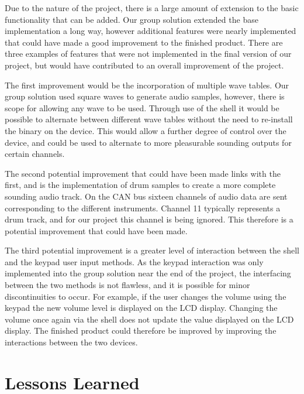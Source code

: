 Due to the nature of the project, there is a large amount of extension to the 
basic functionality that can be added. Our group solution extended the base 
implementation a long way, however additional features were nearly implemented
that could have made a good improvement to the finished product. 
There are three examples of features that were not implemented in the final 
version of our project, but would have contributed to an overall improvement of 
the project. 
\par\bigskip\noindent
The first improvement would be the incorporation of multiple wave 
tables. 
Our group solution used square waves to generate audio samples, however, 
there is scope for allowing any wave to be used. 
Through use of the shell it would be possible to alternate between different 
wave tables without the need to re-install the binary on the device. This would 
allow a further degree of control over the device, and could be used to alternate
to more pleasurable sounding outputs for certain channels. 
\par\bigskip\noindent
The second potential improvement that could have been made links with the first, 
and is the implementation of drum samples to create a more complete sounding 
audio track. On the CAN bus sixteen channels of audio data are sent corresponding 
to the different instruments. Channel 11 typically represents a drum track, and 
for our project this channel is being ignored. This therefore is a potential
improvement that could have been made. 
\par\bigskip\noindent
The third potential improvement is a greater level of interaction between the 
shell and the keypad user input methods. As the keypad interaction was only 
implemented into the group solution near the end of the project, the interfacing 
between the two methods is not flawless, and it is possible for minor 
discontinuities to occur. For example, if the user changes the volume using the 
keypad the new volume level is displayed on the LCD display. Changing the 
volume once again via the shell does not update the value displayed on the LCD 
display. The finished product could therefore be improved by improving the 
interactions between the two devices. 

\section{Lessons Learned}

